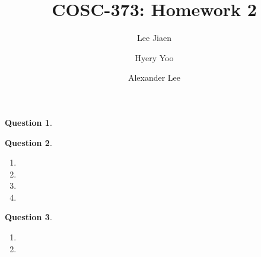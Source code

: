 \documentclass{amsart}
\title{COSC-373: Homework 2}
\author{Lee Jiaen}
\author{Hyery Yoo}
\author{Alexander Lee}
\theoremstyle{definition}
\newtheorem{question}{Question}
\begin{document}
\maketitle

\begin{question}
\end{question}

\begin{question}
  \begin{enumerate}[label={(\alph*)}]
    \item
    \item
    \item
    \item
  \end{enumerate}
\end{question}

\begin{question}
  \begin{enumerate}[label={(\alph*)}]
    \item
    \item
  \end{enumerate}
\end{question}
\end{document}
